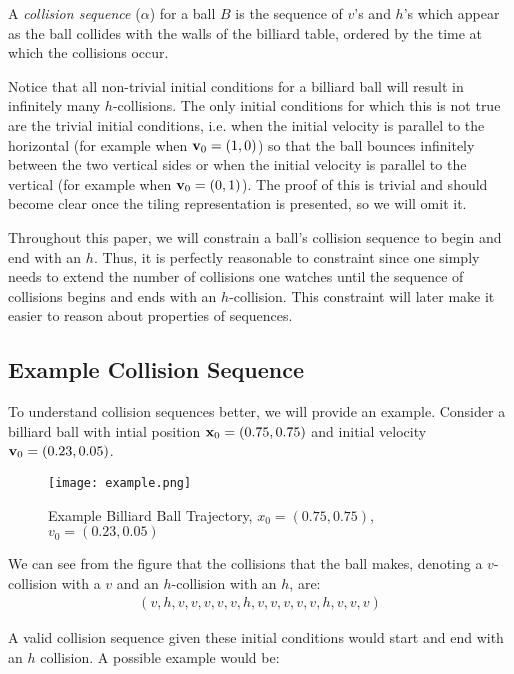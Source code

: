 \begin{definition}
  A \emph{collision sequence} ($\alpha$) for a ball $B$ is the sequence of $v$'s and $h$'s which appear as the ball collides with the walls of the billiard table, ordered by the time at which the collisions occur.
\end{definition}

Notice that all non-trivial initial conditions for a billiard ball will result in infinitely many $h$-collisions. The only initial conditions for which this is not true are the trivial initial conditions, i.e. when the initial velocity is parallel to the horizontal (for example when $\mathbf{v}_0 = (1, 0)$) so that the ball bounces infinitely between the two vertical sides or when the initial velocity is parallel to the vertical (for example when $\mathbf{v}_0 = (0, 1)$). The proof of this is trivial and should become clear once the tiling representation is presented, so we will omit it.

Throughout this paper, we will constrain a ball's collision sequence to begin and end with an $h$. Thus, it is perfectly reasonable to constraint since one simply needs to extend the number of collisions one watches until the sequence of collisions begins and ends with an $h$-collision. This constraint will later make it easier to reason about properties of sequences.

\subsection{Example Collision Sequence}

To understand collision sequences better, we will provide an example. Consider a billiard ball with intial position $\mathbf{x}_0 = (0.75, 0.75)$ and initial velocity $\mathbf{v}_0 = (0.23, 0.05)$.

\begin{figure}
  \texttt{[image: example.png]}
  \caption{\label{fig:example}Example Billiard Ball Trajectory, $x_0 = (0.75, 0.75)$, $v_0 = (0.23, 0.05)$}
\end{figure}

We can see from the figure that the collisions that the ball makes, denoting a $v$-collision with a $v$ and an $h$-collision with an $h$, are:
\begin{eqnarray}
(v, h, v, v, v, v, v, h, v, v, v, v, v, h, v, v, v)
\end{eqnarray}

A valid collision sequence given these initial conditions would start and end with an $h$ collision. A possible example would be:

